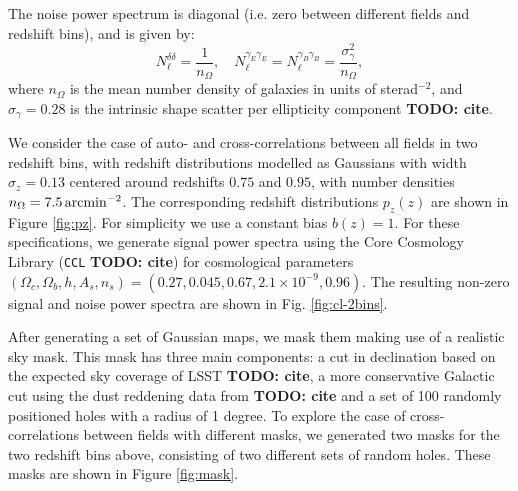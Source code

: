 \documentclass[a4paper,11pt]{article}
\newcommand{\todo}[1]{{\bf TODO: #1}}
\begin{document}
      The noise power spectrum is diagonal (i.e. zero between different fields and redshift bins), and is given by:
      \begin{equation}
        N_\ell^{\delta\delta} = \frac{1}{n_\Omega},\hspace{12pt}
        N_\ell^{\gamma_E\gamma_E} = N_\ell^{\gamma_B\gamma_B} = \frac{\sigma_\gamma^2}{n_\Omega},
      \end{equation}
      where $n_\Omega$ is the mean number density of galaxies in units of sterad$^{-2}$, and $\sigma_\gamma=0.28$ is the intrinsic shape scatter per ellipticity component \todo{cite}.

      We consider the case of auto- and cross-correlations between all fields in two redshift bins, with redshift distributions modelled as Gaussians with width $\sigma_z=0.13$ centered around redshifts $0.75$ and $0.95$, with number densities $n_\Omega=7.5\,{\rm arcmin}^{-2}$. The corresponding redshift distributions $p_z(z)$ are shown in Figure \ref{fig:pz}. For simplicity we use a constant bias $b(z)=1$. For these specifications, we generate signal power spectra using the Core Cosmology Library ({\tt CCL} \todo{cite}) for cosmological parameters $(\Omega_c,\Omega_b,h,A_s,n_s)=(0.27,0.045,0.67,2.1\times10^{-9},0.96)$. The resulting non-zero signal and noise power spectra are shown in Fig. \ref{fig:cl-2bins}.

      After generating a set of Gaussian maps, we mask them making use of a realistic sky mask. This mask has three main components: a cut in declination based on the expected sky coverage of LSST \todo{cite}, a more conservative Galactic cut using the dust reddening data from \todo{cite} and a set of 100 randomly positioned holes with a radius of 1 degree. To explore the case of cross-correlations between fields with different masks, we generated two masks for the two redshift bins above, consisting of two different sets of random holes. These masks are shown in Figure \ref{fig:mask}.
\end{document}
